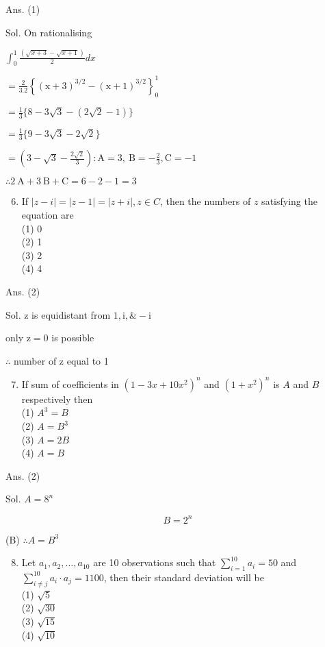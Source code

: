 \documentclass[10pt]{article}
\begin{document}
Ans. (1)

Sol. On rationalising

$\int_{0}^{1} \frac{(\sqrt{x+3}-\sqrt{x+1})}{2} d x$

$=\frac{2}{3.2}\left\{(\mathrm{x}+3)^{3 / 2}-(\mathrm{x}+1)^{3 / 2}\right\}_{0}^{1}$

$=\frac{1}{3}\{8-3 \sqrt{3}-(2 \sqrt{2}-1)\}$

$=\frac{1}{3}\{9-3 \sqrt{3}-2 \sqrt{2}\}$

$=\left(3-\sqrt{3}-\frac{2 \sqrt{2}}{3}\right): \mathrm{A}=3, \mathrm{~B}=-\frac{2}{3}, \mathrm{C}=-1$

$\therefore 2 \mathrm{~A}+3 \mathrm{~B}+\mathrm{C}=6-2-1=3$

\begin{enumerate}
  \setcounter{enumi}{5}
  \item If $|z-i|=|z-1|=|z+i|, z \in C$, then the numbers of $z$ satisfying the equation are\\
(1) 0\\
(2) 1\\
(3) 2\\
(4) 4
\end{enumerate}

Ans. (2)

Sol. $\mathrm{z}$ is equidistant from $1, \mathrm{i}, \&-\mathrm{i}$

only $\mathrm{z}=0$ is possible

$\therefore$ number of $\mathrm{z}$ equal to 1

\begin{enumerate}
  \setcounter{enumi}{6}
  \item If sum of coefficients in $\left(1-3 x+10 x^{2}\right)^{n}$ and $\left(1+x^{2}\right)^{n}$ is $A$ and $B$ respectively then\\
(1) $A^{3}=B$\\
(2) $A=B^{3}$\\
(3) $A=2 B$\\
(4) $A=B$
\end{enumerate}

Ans. (2)

Sol. $A=8^{n}$

$$
B=2^{n}
$$

(B) $\therefore A=B^{3}$

\begin{enumerate}
  \setcounter{enumi}{7}
  \item Let $a_{1}, a_{2}, \ldots, a_{10}$ are 10 observations such that $\sum_{i=1}^{10} a_{i}=50$ and $\sum_{i \neq j}^{10} a_{i} \cdot a_{j}=1100$, then their standard deviation will be\\
(1) $\sqrt{5}$\\
(2) $\sqrt{30}$\\
(3) $\sqrt{15}$\\
(4) $\sqrt{10}$
\end{enumerate}
\end{document}
